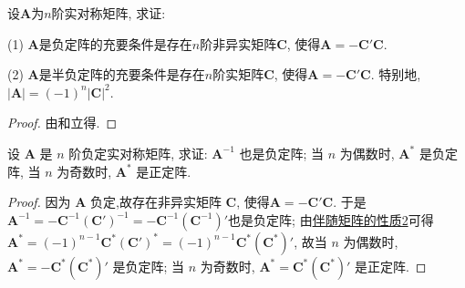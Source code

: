 \documentclass[../../main.tex]{subfiles}%
\begin{document}
\begin{proposition}
设$\boldsymbol{A}$为$n$阶实对称矩阵, 求证:

(1) $\boldsymbol{A}$是负定阵的充要条件是存在$n$阶非异实矩阵$\boldsymbol{C}$, 使得$\boldsymbol{A}=-\boldsymbol{C}'\boldsymbol{C}$.

(2) $\boldsymbol{A}$是半负定阵的充要条件是存在$n$阶实矩阵$\boldsymbol{C}$, 使得$\boldsymbol{A}=-\boldsymbol{C}'\boldsymbol{C}$. 特别地, $|\boldsymbol{A}| = (-1)^n|\boldsymbol{C}|^2$.
\end{proposition}
\begin{proof}
由和立得.
\end{proof}

\begin{proposition}\label{proposition:负定阵的相关性质}
设 \(\boldsymbol{A}\) 是 \(n\) 阶负定实对称矩阵, 求证: \(\boldsymbol{A}^{-1}\) 也是负定阵; 当 \(n\) 为偶数时, \(\boldsymbol{A}^*\) 是负定阵, 当 \(n\) 为奇数时, \(\boldsymbol{A}^*\) 是正定阵.
\end{proposition}
\begin{proof}
因为 \(\boldsymbol{A}\) 负定,故存在非异实矩阵 \(\boldsymbol{C}\), 使得\(\boldsymbol{A}=-\boldsymbol{C}'\boldsymbol{C}\). 于是 \(\boldsymbol{A}^{-1}=-\boldsymbol{C}^{-1}(\boldsymbol{C}')^{-1}=-\boldsymbol{C}^{-1}(\boldsymbol{C}^{-1})'\)也是负定阵; 由\hyperref[proposition:伴随矩阵的性质]{伴随矩阵的性质2}可得 \(\boldsymbol{A}^*=(-1)^{n - 1}\boldsymbol{C}^*(\boldsymbol{C}')^*=(-1)^{n - 1}\boldsymbol{C}^*(\boldsymbol{C}^*)'\), 故当 \(n\) 为偶数时, \(\boldsymbol{A}^*=-\boldsymbol{C}^*(\boldsymbol{C}^*)'\) 是负定阵; 当 \(n\) 为奇数时, \(\boldsymbol{A}^*=\boldsymbol{C}^*(\boldsymbol{C}^*)'\) 是正定阵.
\end{proof}
\end{document}
